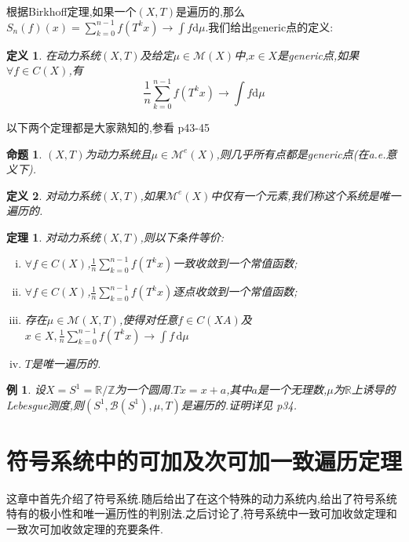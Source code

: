 \documentclass[a4paper,11pt,oneside]{book}
\newtheorem{theorem}{\textbf{\hspace{0.7cm}定理}}[section]
\newtheorem{example}{\textbf{\hspace{0.7cm}例}}[section]
\newtheorem{definition}{\textbf{\hspace{0.7cm}定义}}[section]
\newtheorem{proposition}{\textbf{\hspace{0.7cm}命题}}[section]
\begin{document}
根据Birkhoff定理,如果一个$(X,T)$是遍历的,那么$S_n(f)(x)=\sum_{k=0}^{n-1}f(T^kx)\rightarrow \int f \mathrm d \mu$.我们给出generic点的定义:

\begin{definition}
在动力系统$(X,T)$及给定$\mu\in\mathcal{M}(X)$中,$x\in X$是generic点,如果$\forall f\in C(X)$,有
$$\frac{1}{n}\sum_{k=0}^{n-1}f(T^kx)\rightarrow \int f\mathrm d \mu$$
\end{definition}

以下两个定理都是大家熟知的,参看\cite{hy} p43-45


\begin{proposition}
$(X,T)$为动力系统且$\mu\in\mathcal{M}^e(X)$,则几乎所有点都是generic点(在a.e.意义下).
\end{proposition}


\begin{definition}
对动力系统$(X,T)$,如果$\mathcal{M}^e(X)$中仅有一个元素,我们称这个系统是唯一遍历的.
\end{definition}

\begin{theorem}
对动力系统$(X,T)$,则以下条件等价:
\begin{enumerate}[(i)]
\item $\forall f\in C(X)$,$\frac{1}{n}\sum_{k=0}^{n-1}f(T^kx)$一致收敛到一个常值函数;
\item $\forall f\in C(X)$,$\frac{1}{n}\sum_{k=0}^{n-1}f(T^kx)$逐点收敛到一个常值函数;
\item 存在$\mu\in\mathcal{M}(X,T)$,使得对任意$f\in C(XA)$及$x\in X,\frac{1}{n}\sum_{k=0}^{n-1}f(T^kx)\rightarrow \int\!f \, \mathrm d \mu$
\item $T$是唯一遍历的.
\end{enumerate}
\end{theorem}

\begin{example}
设$X=S^1=\mathbb{R}/\mathbb{Z}$为一个圆周.$Tx=x+a$,其中$a$是一个无理数,$\mu$为$\mathbb{R}$上诱导的Lebesgue测度,则$(S^1,\mathscr{B}(S^1),\mu,T)$是遍历的.证明详见\cite{hy} p34.	
\end{example}
\chapter{符号系统中的可加及次可加一致遍历定理}
\thispagestyle{fancy}
这章中首先介绍了符号系统.随后给出了在这个特殊的动力系统内,给出了符号系统特有的极小性和唯一遍历性的判别法.之后讨论了,符号系统中一致可加收敛定理和一致次可加收敛定理的充要条件.
\end{document}
